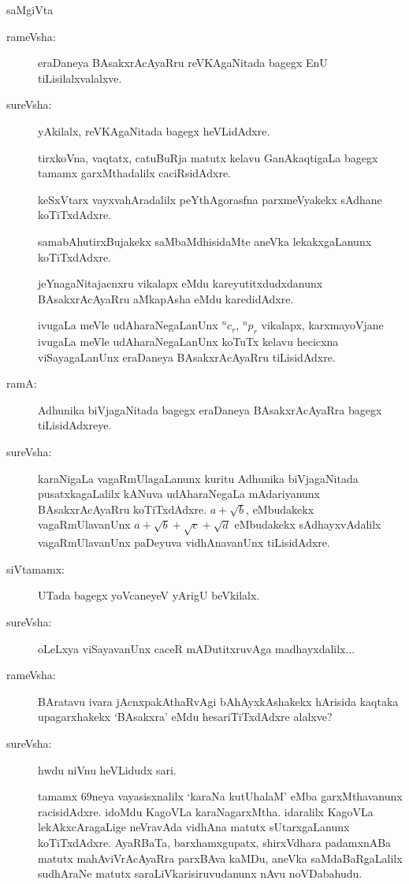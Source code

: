 \centerline{saMgiVta}
\begin{description}
\item[rameVsha:] eraDaneya BAsakxrAcAyaRru reVKAgaNitada bagegx EnU tiLisilalxvalalxve.

\item[sureVsha:] yAkilalx, reVKAgaNitada bagegx heVLidAdxre.

tirxkoVna, vaqtatx, catuBuRja matutx kelavu GanAkaqtigaLa bagegx tamamx garxMthadalilx caciRsidAdxre.

keSxVtarx vayxvahAradalilx peYthAgorasfna parxmeVyakekx sAdhane koTiTxdAdxre.

samabAhutirxBujakekx saMbaMdhisidaMte aneVka lekakxgaLanunx koTiTxdAdxre.

jeYnagaNitajacnxru vikalapx eMdu kareyutitxdudxdanunx BAsakxrAcAyaRru aMkapAsha eMdu karedidAdxre.

ivugaLa meVle udAharaNegaLanUnx ${}^{n}c_{r}$, ${}^{n}p_{r}$ vikalapx, karxmayoVjane ivugaLa meVle udAharaNegaLanUnx koTuTx kelavu hecicxna viSayagaLanUnx eraDaneya BAsakxrAcAyaRru tiLisidAdxre.

\item[ramA:] Adhunika biVjagaNitada bagegx eraDaneya BAsakxrAcAyaRra bagegx tiLisidAdxreye.

\item[sureVsha:] karaNigaLa vagaRmUlagaLanunx kuritu Adhunika biVjagaNitada pusatxkagaLalilx kANuva udAharaNegaLa mAdariyanunx BAsakxrAcAyaRru koTiTxdAdxre. $a+\sqrt{b}$, eMbudakekx vagaRmUlavanUnx $a+\sqrt{b}+\sqrt{c}+\sqrt{d}$ eMbudakekx sAdhayxvAdalilx vagaRmUlavanUnx paDeyuva vidhAnavanUnx tiLisidAdxre.

\item[siVtamamx:] UTada bagegx yoVcaneyeV yArigU beVkilalx.

\item[sureVsha:] oLeLxya viSayavanUnx caceR mADutitxruvAga madhayxdalilx...

\item[rameVsha:] BAratavu ivara jAcnxpakAthaRvAgi bAhAyxkAshakekx hArisida kaqtaka upagarxhakekx `BAsakxra' eMdu hesariTiTxdAdxre alalxve?

\item[sureVsha:] hwdu niVnu heVLidudx sari.

tamamx $69$neya vayasisxnalilx `karaNa kutUhalaM' eMba garxMthavanunx racisidAdxre. idoMdu KagoVLa karaNagarxMtha. idaralilx KagoVLa lekAkxcAragaLige neVravAda vidhAna matutx sUtarxgaLanunx koTiTxdAdxre. AyaRBaTa, barxhamxgupatx, shirxVdhara padamxnABa matutx mahAviVrAcAyaRra parxBAva kaMDu, aneVka saMdaBaRgaLalilx sudhAraNe matutx saraLiVkarisiruvudanunx nAvu noVDabahudu.


\end{description}

